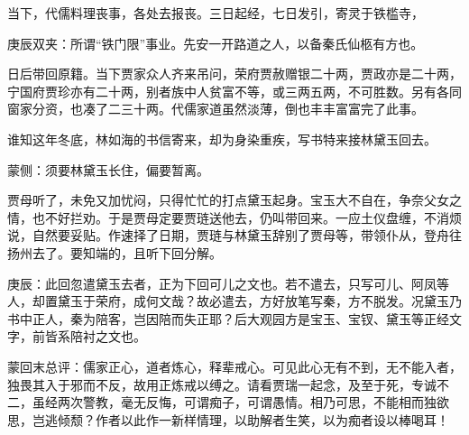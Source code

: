 \begin{parag}
    当下，代儒料理丧事，各处去报丧。三日起经，七日发引，寄灵于铁槛寺，\begin{note}庚辰双夹：所谓“铁门限”事业。先安一开路道之人，以备秦氏仙柩有方也。\end{note}日后带回原籍。当下贾家众人齐来吊问，荣府贾赦赠银二十两，贾政亦是二十两，宁国府贾珍亦有二十两，别者族中人贫富不等，或三两五两，不可胜数。另有各同窗家分资，也凑了二三十两。代儒家道虽然淡薄，倒也丰丰富富完了此事。
\end{parag}


\begin{parag}
    谁知这年冬底，林如海的书信寄来，却为身染重疾，写书特来接林黛玉回去。\begin{note}蒙侧：须要林黛玉长住，偏要暂离。\end{note}贾母听了，未免又加忧闷，只得忙忙的打点黛玉起身。宝玉大不自在，争奈父女之情，也不好拦劝。于是贾母定要贾琏送他去，仍叫带回来。一应土仪盘缠，不消烦说，自然要妥贴。作速择了日期，贾琏与林黛玉辞别了贾母等，带领仆从，登舟往扬州去了。要知端的，且听下回分解。
\end{parag}


\begin{parag}
    \begin{note}庚辰：此回忽遣黛玉去者，正为下回可儿之文也。若不遣去，只写可儿、阿凤等人，却置黛玉于荣府，成何文哉？故必遣去，方好放笔写秦，方不脱发。况黛玉乃书中正人，秦为陪客，岂因陪而失正耶？后大观园方是宝玉、宝钗、黛玉等正经文字，前皆系陪衬之文也。\end{note}
\end{parag}


\begin{parag}
    \begin{note}蒙回末总评：儒家正心，道者炼心，释辈戒心。可见此心无有不到，无不能入者，独畏其入于邪而不反，故用正炼戒以缚之。请看贾瑞一起念，及至于死，专诚不二，虽经两次警教，毫无反悔，可谓痴子，可谓愚情。相乃可思，不能相而独欲思，岂逃倾颓？作者以此作一新样情理，以助解者生笑，以为痴者设以棒喝耳！\end{note}
\end{parag}